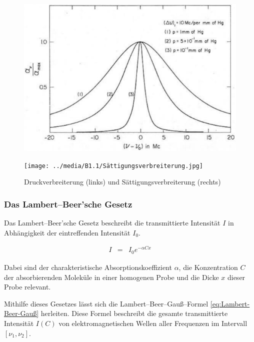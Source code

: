 \documentclass[12pt,a4paper]{scrartcl}
\numberwithin{equation}{section} %
\begin{document}
\begin{figure}[h]
  \centering
  \begin{minipage}{0.49\textwidth}
    \includegraphics[width=\textwidth]{../media/B1.1/Druckverbreiterung.jpg}
  \end{minipage}
  \begin{minipage}{0.49\textwidth}
    \texttt{[image: ../media/B1.1/Sättigungsverbreiterung.jpg]}
  \end{minipage}
  \caption{Druckverbreiterung (links) und Sättigungsverbreiterung (rechts) \cite{UzK}}
  \label{abb:Druckverbreiterung & Sättigungsverbreiterung}
\end{figure}

\hypertarget{das-lambertbeersche-gesetz}{\subsubsection{Das Lambert--Beer'sche Gesetz}\label{das-lambertbeersche-gesetz}}
Das Lambert--Beer'sche Gesetz beschreibt die transmittierte Intensität $I$ in Abhängigkeit der eintreffenden Intensität $I_0$. \cite{HakenWolf} %

\begin{eqnarray}
  I &=& I_0 e^{- \alpha C x} \label{eq:Lambert-Beer}
\end{eqnarray}

\noindent
Dabei sind der charakteristische Absorptionskoeffizient $\alpha$, die Konzentration $C$ der absorbierenden Moleküle in einer homogenen Probe und die Dicke $x$ dieser Probe relevant.

Mithilfe dieses Gesetzes lässt sich die Lambert--Beer--Gauß--Formel \eqref{eq:Lambert-Beer-Gauß} herleiten. Diese Formel beschreibt die gesamte transmittierte Intensität $I(C)$ von elektromagnetischen Wellen aller Frequenzen im Intervall $[\nu_1, \nu_2]$.
\end{document}
